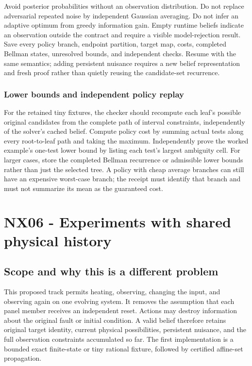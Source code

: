 \documentclass[
  11pt,
  a4paper,
]{report}
\begin{document}
Avoid posterior probabilities without an observation distribution. Do
not replace adversarial repeated noise by independent Gaussian
averaging. Do not infer an adaptive optimum from greedy information
gain. Empty runtime beliefs indicate an observation outside the contract
and require a visible model-rejection result. Save every policy branch,
endpoint partition, target map, costs, completed Bellman states,
unresolved bounds, and independent checks. Resume with the same
semantics; adding persistent nuisance requires a new belief
representation and fresh proof rather than quietly reusing the
candidate-set recurrence.

\hypertarget{lower-bounds-and-independent-policy-replay}{%
\subsection{Lower bounds and independent policy
replay}\label{lower-bounds-and-independent-policy-replay}}

For the retained tiny fixtures, the checker should recompute each leaf's
possible original candidates from the complete path of interval
constraints, independently of the solver's cached belief. Compute policy
cost by summing actual tests along every root-to-leaf path and taking
the maximum. Independently prove the worked example's one-test lower
bound by listing each test's largest ambiguity cell. For larger cases,
store the completed Bellman recurrence or admissible lower bounds rather
than just the selected tree. A policy with cheap average branches can
still have an expensive worst-case branch; the receipt must identify
that branch and must not summarize its mean as the guaranteed cost.

\hypertarget{nx06---experiments-with-shared-physical-history}{%
\chapter{NX06 - Experiments with shared physical
history}\label{nx06---experiments-with-shared-physical-history}}

\hypertarget{scope-and-why-this-is-a-different-problem}{%
\section{Scope and why this is a different
problem}\label{scope-and-why-this-is-a-different-problem}}

This proposed track permits heating, observing, changing the input, and
observing again on one evolving system. It removes the assumption that
each panel member receives an independent reset. Actions may destroy
information about the original fault or initial condition. A valid
belief therefore retains original target identity, current physical
possibilities, persistent nuisance, and the full observation constraints
accumulated so far. The first implementation is a bounded exact
finite-state or tiny rational fixture, followed by certified affine-set
propagation.
\end{document}
